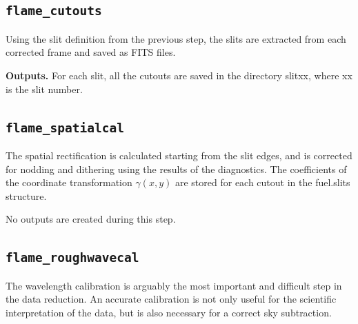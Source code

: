 \documentclass[a4paper]{article}
\begin{document}
\begin{sloppypar}
\subsection{\texttt{flame\_cutouts}}

Using the slit definition from the previous step, the slits are extracted from each corrected frame and saved as FITS files.

\medskip
\noindent
\textbf{Outputs.} For each slit, all the cutouts are saved in the directory slitxx, where xx is the slit number.

\subsection{\texttt{flame\_spatialcal}}

The spatial rectification is calculated starting from the slit edges, and is corrected for nodding and dithering using the results of the diagnostics. The coefficients of the coordinate transformation $\gamma(x,y)$ are stored for each cutout in the fuel.slits structure.

\medskip
\noindent
No outputs are created during this step.


\subsection{\texttt{flame\_roughwavecal}}

The wavelength calibration is arguably the most important and difficult step in the data reduction. An accurate calibration is not only useful for the scientific interpretation of the data, but is also necessary for a correct sky subtraction.


\end{sloppypar}
\end{document}
